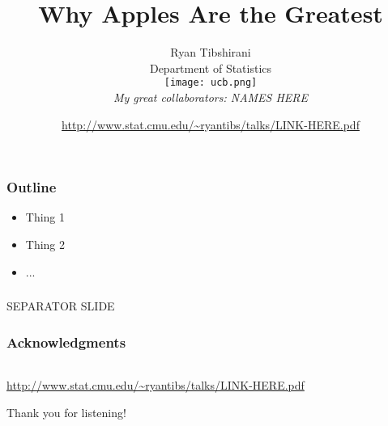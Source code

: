 \documentclass[mathserif]{beamer} %
\title{Why Apples Are the Greatest}
\author{\large Ryan Tibshirani \\
Department of Statistics \\
\smallskip 
\texttt{[image: ucb.png]} \\
\bigskip
\normalsize
{\it My great collaborators: NAMES HERE}}
\date{\footnotesize
\url{http://www.stat.cmu.edu/~ryantibs/talks/LINK-HERE.pdf}}
\begin{document}
\begin{frame}
\bigskip
\maketitle
\thispagestyle{empty}
\end{frame} 
\addtocounter{framenumber}{-1}

\begin{frame}
\frametitle{}
\end{frame}

\begin{frame}
\frametitle{Outline}
\begin{itemize}
\item Thing 1
\item Thing 2
\item ...
\end{itemize}
\end{frame}

\begin{frame}
\frametitle{}
\centering\Large\blue 
\bigskip
SEPARATOR SLIDE
\end{frame}

\begin{frame}
\frametitle{Acknowledgments}
\begin{center}
\begin{tabular}{ccc}
\end{tabular}

\bigskip
{\small
\url{http://www.stat.cmu.edu/~ryantibs/talks/LINK-HERE.pdf}}

\bigskip
Thank you for listening!
\end{center}
\end{frame}
\end{document}
